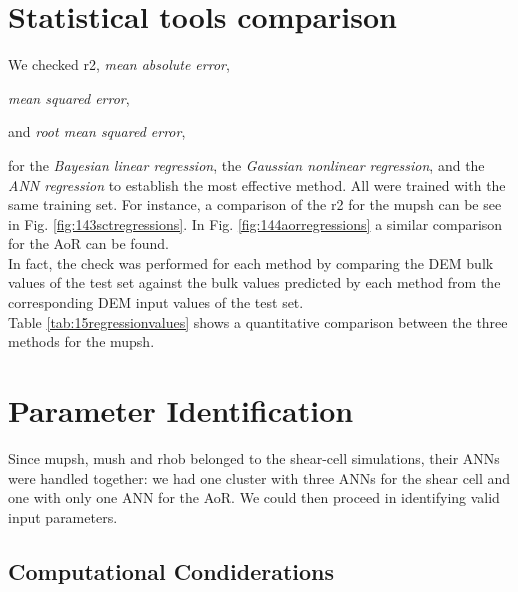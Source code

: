



\section{Statistical tools comparison}
\label{sec:statisticaltoolscomparison}

%



We checked \acs{r2}, \textit{mean absolute error}, 

\textit{mean squared error},

and \textit{root mean squared error},

for the \textit{Bayesian linear
regression}, the \textit{Gaussian nonlinear
regression}, and the
\textit{\acs{ANN} regression} to establish the most effective method.
All were trained with the same training set. 
For instance, a comparison of the \acs{r2} for the \acs{mupsh} can be see in 
Fig. \ref{fig:143sctregressions}.
In Fig. \ref{fig:144aorregressions} a similar comparison for the \acs{AoR} can
be found.\\
In fact, the check was performed for each method by comparing the
\acs{DEM} bulk values of the test set against the bulk values predicted by each method from the 
corresponding \acs{DEM} input values of the test set. \\
Table \ref{tab:15regressionvalues} shows a quantitative comparison between the
three methods for the \acs{mupsh}. 


\section{Parameter Identification}
\label{sec:parameteridentification}

Since \acs{mupsh}, \acs{mush} and \acs{rhob} belonged to the shear-cell
simulations, their \acs{ANNs} were handled together: we had one cluster with three 
\acs{ANNs} for the shear cell and one with only one \acs{ANN} for the \acs{AoR}.
We could then proceed in identifying valid input parameters.

\subsection{Computational Condiderations}
\label{subsec:computationalcondiderations}

